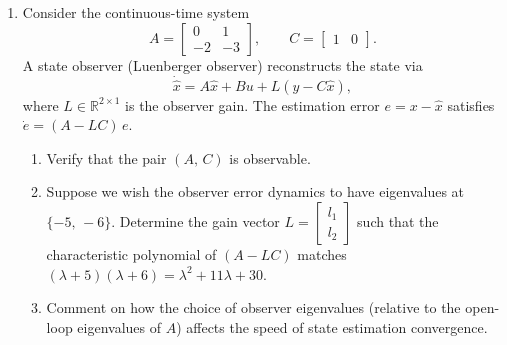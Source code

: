 \begin{enumerate}
\item Consider the continuous-time system
\[
A = \begin{bmatrix} 0 & 1 \\ -2 & -3 \end{bmatrix}, \qquad
C = \begin{bmatrix} 1 & 0 \end{bmatrix}.
\]
A state observer (Luenberger observer) reconstructs the state via
\[
\dot{\hat{x}} = A \hat{x} + B u + L(y - C \hat{x}),
\]
where $L \in \mathbb{R}^{2 \times 1}$ is the observer gain. The estimation error $e = x - \hat{x}$ satisfies $\dot{e} = (A - LC)\,e$.
\begin{enumerate}
	\item Verify that the pair $(A,\,C)$ is observable.
	\item Suppose we wish the observer error dynamics to have eigenvalues at $\{-5,\, -6\}$. Determine the gain vector $L = \begin{bmatrix} l_1 \\ l_2 \end{bmatrix}$ such that the characteristic polynomial of $(A - LC)$ matches $(\lambda + 5)(\lambda + 6) = \lambda^2 + 11\lambda + 30$.
	\item Comment on how the choice of observer eigenvalues (relative to the open-loop eigenvalues of $A$) affects the speed of state estimation convergence.
\end{enumerate}

\end{enumerate}